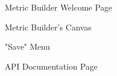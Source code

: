 			\begin{figure}[t]
				\centering
					\caption{Metric Builder Welcome Page}
					\label{fig:mb}
			\end{figure}
			
			\begin{figure}[t]
				\centering
					\caption{Metric Builder's Canvas}
					\label{fig:inuse}
			\end{figure}
			
			\begin{figure}[t]
				\centering
					\caption{"Save" Menu}
					\label{fig:save}
			\end{figure}
			
			\begin{figure}[t]
				\centering
					\caption{API Documentation Page}
					\label{fig:docs}
			\end{figure}